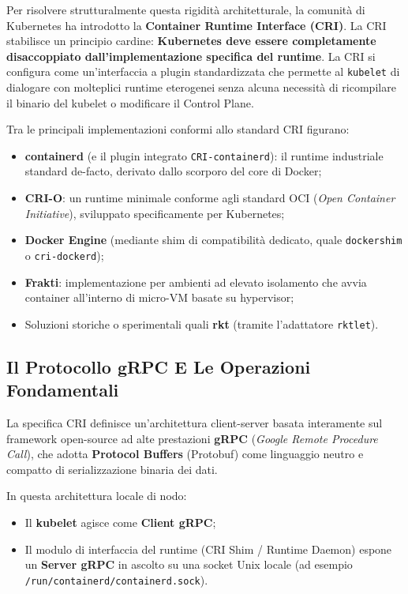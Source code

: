 \documentclass[11pt, a4paper]{article}
\begin{document}
Per risolvere strutturalmente questa rigidità architetturale, la comunità di Kubernetes ha introdotto la \textbf{Container Runtime Interface (CRI)}. La CRI stabilisce un principio cardine: \textbf{Kubernetes deve essere completamente disaccoppiato dall'implementazione specifica del runtime}. La CRI si configura come un'interfaccia a plugin standardizzata che permette al \texttt{kubelet} di dialogare con molteplici runtime eterogenei senza alcuna necessità di ricompilare il binario del kubelet o modificare il Control Plane.

Tra le principali implementazioni conformi allo standard CRI figurano:
\begin{itemize}[noitemsep]
    \item \textbf{containerd} (e il plugin integrato \texttt{CRI-containerd}): il runtime industriale standard de-facto, derivato dallo scorporo del core di Docker;
    \item \textbf{CRI-O}: un runtime minimale conforme agli standard OCI (\emph{Open Container Initiative}), sviluppato specificamente per Kubernetes;
    \item \textbf{Docker Engine} (mediante shim di compatibilità dedicato, quale \texttt{dockershim} o \texttt{cri-dockerd});
    \item \textbf{Frakti}: implementazione per ambienti ad elevato isolamento che avvia container all'interno di micro-VM basate su hypervisor;
    \item Soluzioni storiche o sperimentali quali \textbf{rkt} (tramite l'adattatore \texttt{rktlet}).
\end{itemize}

\subsection{Il Protocollo gRPC E Le Operazioni Fondamentali}
La specifica CRI definisce un'architettura client-server basata interamente sul framework open-source ad alte prestazioni \textbf{gRPC} (\emph{Google Remote Procedure Call}), che adotta \textbf{Protocol Buffers} (Protobuf) come linguaggio neutro e compatto di serializzazione binaria dei dati.

In questa architettura locale di nodo:
\begin{itemize}[noitemsep]
    \item Il \textbf{kubelet} agisce come \textbf{Client gRPC};
    \item Il modulo di interfaccia del runtime (CRI Shim / Runtime Daemon) espone un \textbf{Server gRPC} in ascolto su una socket Unix locale (ad esempio \texttt{/run/containerd/containerd.sock}).
\end{itemize}
\end{document}
